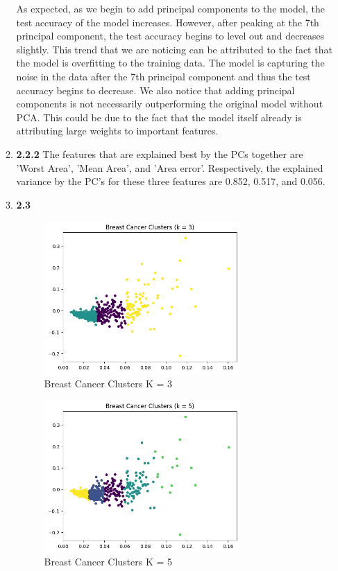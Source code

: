 \documentclass[12pt]{article}
\begin{document}
\begin{enumerate}
\begin{enumerate}
    As expected, as we begin to add principal components to the model, the test accuracy of the model increases. However, after peaking at the 7th principal component, the test accuracy begins to level out and decreases slightly. This trend that we
    are noticing can be attributed to the fact that the model is overfitting to the training data. The model is capturing the noise in the data after the 7th principal component and thus the test accuracy begins to decrease. We also notice that
    adding principal components is not necessarily outperforming the original model without PCA. This could be due to the fact that the model itself already is attributing large weights to important features. 
    \item \textbf{2.2.2}
      The features that are explained best by the PCs together are 'Worst Area', 'Mean Area', and 'Area error'. Respectively, the explained variance by the PC's for 
      these three features are 0.852, 0.517, and 0.056. 
    \item \textbf{2.3}

    \begin{figure}[H]
      \centering 
      \includegraphics[width=0.75\textwidth]{2_3_3.png}
      \caption{Breast Cancer Clusters K = 3}
    \end{figure}

    \begin{figure}[H]
      \centering 
      \includegraphics[width=0.75\textwidth]{2_3_5.png}
      \caption{Breast Cancer Clusters K = 5}
    \end{figure}


\end{enumerate}
\end{enumerate}
\end{document}
